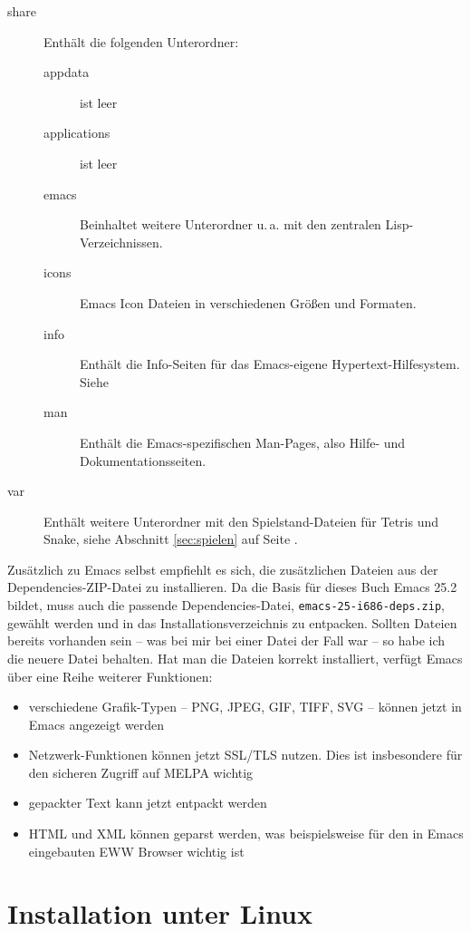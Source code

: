 \documentclass[12pt,ngerman]{scrbook}
\begin{document}
\begin{description}
\item[share] Enthält die folgenden Unterordner:

\begin{description}
\item[appdata] ist leer
\item[applications] ist leer
\item[emacs] Beinhaltet weitere Unterordner u.\,a. mit den zentralen Lisp-Verzeichnissen.
\item[icons] Emacs Icon Dateien in verschiedenen Größen und Formaten.
\item[info] Enthält die Info-Seiten für das Emacs-eigene Hypertext-Hilfesystem. Siehe 
\item[man] Enthält die Emacs-spezifischen Man-Pages, also Hilfe- und Dokumentationsseiten. 
\end{description}



\item[var] Enthält weitere Unterordner mit den Spielstand-Dateien für Tetris und Snake, siehe Abschnitt \ref{sec:spielen} auf Seite \pageref{sec:spielen}.
\end{description}

Zusätzlich zu Emacs selbst empfiehlt es sich, die zusätzlichen Dateien aus der Dependencies-ZIP-Datei zu installieren. Da die Basis für dieses Buch Emacs 25.2 bildet, muss auch die passende Dependencies-Datei, \texttt{emacs-25-i686-deps.zip}, gewählt werden und in das Installationsverzeichnis zu entpacken. Sollten Dateien bereits vorhanden sein -- was bei mir bei einer Datei der Fall war -- so habe ich die neuere Datei behalten. Hat man die Dateien korrekt installiert, verfügt Emacs über eine Reihe weiterer Funktionen:

\begin{itemize}
	\item verschiedene Grafik-Typen -- PNG, JPEG, GIF, TIFF, SVG -- können jetzt in Emacs angezeigt werden
	\item Netzwerk-Funktionen können jetzt SSL/TLS nutzen. Dies ist insbesondere für den sicheren Zugriff auf MELPA wichtig
	\item gepackter Text kann jetzt entpackt werden
	\item HTML und XML können geparst werden, was beispielsweise für den in Emacs eingebauten EWW Browser wichtig ist
	\end{itemize} 


\section{Installation unter Linux}
\end{document}
